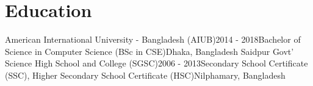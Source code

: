 \section{Education}
\resumeSubHeadingListStart
\resumeSubheading
{American International University - Bangladesh (AIUB)}{2014 - 2018}{Bachelor of Science in Computer Science (BSc in CSE)}{Dhaka, Bangladesh}
\resumeItemListStart
{}
\resumeItemListEnd
\resumeSubheading
{Saidpur Govt’ Science High School and College (SGSC)}{2006 - 2013}{Secondary School Certificate (SSC), Higher Secondary School Certificate (HSC)}{Nilphamary, Bangladesh}
\resumeSubHeadingListEnd
